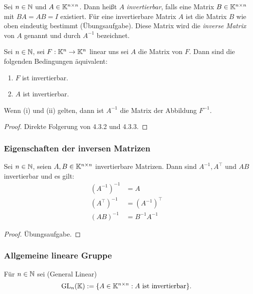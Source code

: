 Sei $ n\in\mathbb N $ und $ A\in\mathbb K^{n \times n} $. Dann heißt $ A $ \emph{invertierbar}, falls eine Matrix $ B\in\mathbb K^{n \times n}$ mit $ BA = AB = I $ existiert. Für eine invertierbare Matrix $ A $ ist die Matrix $ B $ wie oben eindeutig bestimmt (Übungsaufgabe). Diese Matrix wird die \emph{inverse Matrix} von $ A $ genannt und durch $ A^{-1} $ bezeichnet.

\begin{propn}
	Sei $ n\in\mathbb N $, sei $ F:\mathbb K^n\to\mathbb K^n $ linear uns sei $ A $ die Matrix von $ F $. Dann sind die folgenden Bedingungen äquivalent:
	\begin{enumerate}
		\item $ F $ ist invertierbar.
		\item $ A $ ist invertierbar.
	\end{enumerate}
	Wenn {\normalfont(i)} und {\normalfont(ii)} gelten, dann ist $ A^{-1} $ die Matrix der Abbildung $ F^{-1} $.
\end{propn}
\begin{proof}
	Direkte Folgerung von 4.3.2 und 4.3.3.
\end{proof}

\subsubsection{Eigenschaften der inversen Matrizen}

\begin{propn}
	Sei $ n\in\mathbb N $, seien $ A,B\in\mathbb K^{n \times n} $ invertierbare Matrizen. Dann sind $ A^{-1}, A^\top $ und $ AB $ invertierbar und es gilt:
	\begin{align}
		(A^{-1})^{-1} &= A\\
		(A^\top)^{-1} &= (A^{-1})^\top\\
		(AB)^{-1} &= B^{-1}A^{-1}
	\end{align}
\end{propn}
\begin{proof}
	Übungsaufgabe.
\end{proof}

\subsubsection{Allgemeine lineare Gruppe}

Für $ n\in\mathbb N $ sei (\glqq General Linear\grqq)
\begin{equation}
	\operatorname{GL}_n(\mathbb K) := \{ A\in\mathbb K^{n \times n} : \text{$ A $ ist invertierbar} \}.
\end{equation}

